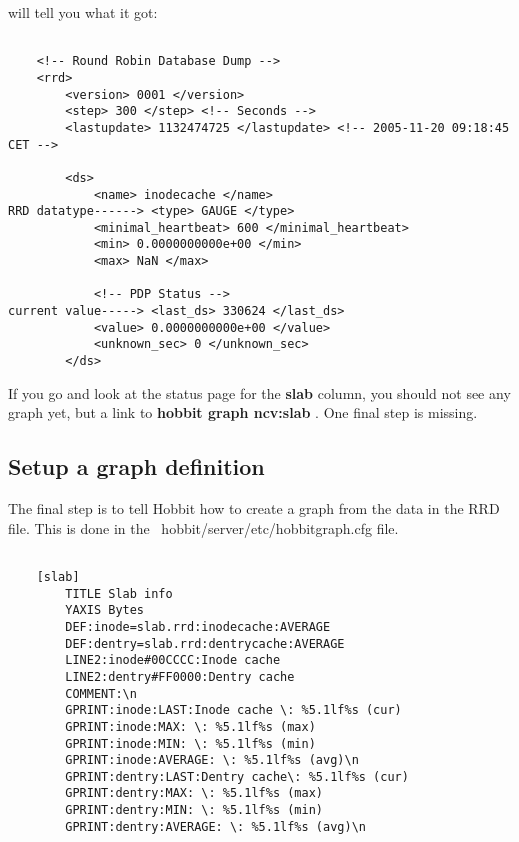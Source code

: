  will tell you what it got: \begin{verbatim}

	<!-- Round Robin Database Dump -->
	<rrd>
		<version> 0001 </version>
		<step> 300 </step> <!-- Seconds -->
		<lastupdate> 1132474725 </lastupdate> <!-- 2005-11-20 09:18:45 CET -->

		<ds>
			<name> inodecache </name>
RRD datatype------>	<type> GAUGE </type>
			<minimal_heartbeat> 600 </minimal_heartbeat>
			<min> 0.0000000000e+00 </min>
			<max> NaN </max>

			<!-- PDP Status -->
current value----->	<last_ds> 330624 </last_ds>
			<value> 0.0000000000e+00 </value>
			<unknown_sec> 0 </unknown_sec>
		</ds>

\end{verbatim}



 If you go and look at the status page for the \textbf{slab}
 column, you should not see any graph yet, but a link to \textbf{hobbit graph ncv:slab}
. One final step is missing.

\subsection{Setup a graph definition}


 The final step is to tell Hobbit how to create a graph from the data in the RRD file. This is done in the ~hobbit/server/etc/hobbitgraph.cfg file. \begin{verbatim}

	[slab]
		TITLE Slab info
		YAXIS Bytes
		DEF:inode=slab.rrd:inodecache:AVERAGE
		DEF:dentry=slab.rrd:dentrycache:AVERAGE
		LINE2:inode#00CCCC:Inode cache
		LINE2:dentry#FF0000:Dentry cache
		COMMENT:\n
		GPRINT:inode:LAST:Inode cache \: %5.1lf%s (cur)
		GPRINT:inode:MAX: \: %5.1lf%s (max)
		GPRINT:inode:MIN: \: %5.1lf%s (min)
		GPRINT:inode:AVERAGE: \: %5.1lf%s (avg)\n
		GPRINT:dentry:LAST:Dentry cache\: %5.1lf%s (cur)
		GPRINT:dentry:MAX: \: %5.1lf%s (max)
		GPRINT:dentry:MIN: \: %5.1lf%s (min)
		GPRINT:dentry:AVERAGE: \: %5.1lf%s (avg)\n

\end{verbatim}



